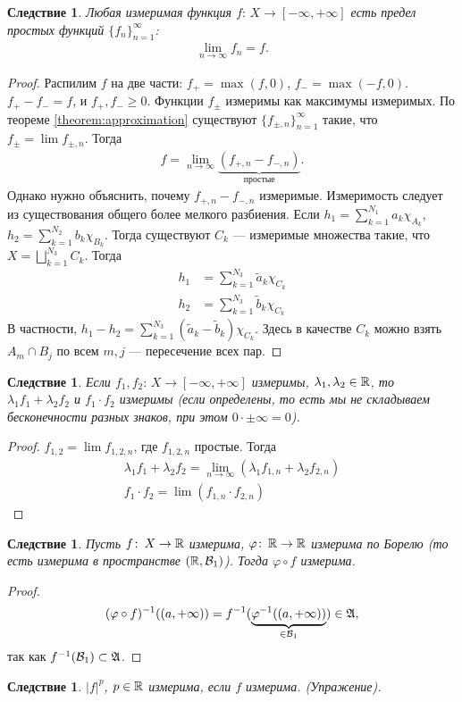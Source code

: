 \documentclass[a4paper,14pt]{extarticle}
\newcounter{theoremCnt}
\theoremstyle{definition}
\theoremstyle{plain}
\theoremstyle{plain}
\theoremstyle{plain}
\newtheorem{crly}[theoremCnt]{Следствие}
\theoremstyle{plain}
\theoremstyle{definition}
\theoremstyle{definition}
\theoremstyle{definition}
\theoremstyle{definition}
\theoremstyle{definition}
\theoremstyle{definition}
\theoremstyle{plain}
\theoremstyle{plain}
\theoremstyle{plain}
\theoremstyle{plain}
\theoremstyle{definition}
\theoremstyle{definition}
\theoremstyle{definition}
\theoremstyle{definition}
\theoremstyle{definition}
\newcommand{\R}{\ensuremath \mathbb{R}}
\newcommand{\A}{\ensuremath \mathfrak{A}}
\begin{document}
\begin{crly}
 Любая измеримая функция $f \colon\, X \to [-\infty, +\infty] $ есть предел простых функций $\{f_{n}\}_{n=1}^{\infty} $: \begin{align*}
  \lim_{n \to \infty} f_n = f
 .\end{align*} 
\end{crly}
\begin{proof}
Распилим $f$ на две части: $f_+ = \max(f, 0)$, $f_- = \max(-f, 0)$. $f_+ - f_- = f$, и  $f_+, f_- \geqslant 0$. Функции $f_{\pm}$ измеримы как максимумы измеримых. По теореме \ref{theorem:approximation} существуют $\{f_{\pm,n}\}_{n=1}^{\infty} $ такие, что $f_{\pm} = \lim f_{\pm,n}$. Тогда \begin{align*}
  f = \lim_{n \to \infty} \underbrace{(f_{+,n} - f_{-,n})}_{\text{ простые }}
 .\end{align*} Однако нужно объяснить, почему $f_{+,n} - f_{-,n}$ измеримые. Измеримость следует из существования общего более мелкого разбиения. Если  $h_1 = \sum_{k=1}^{N_1} a_k \chi_{A_k}$, $h_2 = \sum_{k=1}^{N_2} b_k \chi_{B_k}$. Тогда существуют $C_k$ --- измеримые множества такие, что  $X = \bigsqcup_{k=1}^{N_3} C_k $. Тогда \begin{align*}
 h_1 &= \sum_{k=1}^{N_3} \tilde a_{k} \chi_{C_k} \\
 h_2 &= \sum_{k=1}^{N_3} \tilde b_{k} \chi_{C_k}
\end{align*} В частности, $h_1 - h_2 = \sum_{k=1}^{N_3} (\tilde a_k - \tilde b_k) \chi_{C_k}$. Здесь в качестве $C_k$ можно взять $A_m \cap B_j$ по всем $m,j$ --- пересечение всех пар.
\end{proof}
\begin{crly}
 Если $f_1,f_2 \colon\, X \to [-\infty, +\infty] $ измеримы, $\lambda_1, \lambda_2 \in \R$, то $\lambda_1 f_1 + \lambda_2 f_2$ и $f_1 \cdot f_2$ измеримы (если определены, то есть мы не складываем бесконечности разных знаков, при этом $0 \cdot \pm \infty = 0$).
\end{crly}
\begin{proof}
 $ f_{1,2} = \lim f_{1,2,n} $, где $f_{1,2,n}$ простые. Тогда \begin{align*}
  \lambda_1 f_1 + \lambda_2 f_2 = \lim_{n \to \infty} \left( \lambda_1 f_{1,n} + \lambda_2 f_{2,n} \right) \\
  f_1 \cdot f_2 = \lim (f_{1,n} \cdot f_{2,n})
 \end{align*} 
\end{proof}
\begin{crly}
 Пусть $f \colon\, X \to \R  $ измерима, $\varphi \colon\, \R \to \R  $ измерима по Борелю (то есть измерима в пространстве $(\R, \B_1)$). Тогда $\varphi \circ f$ измерима.
\end{crly}
\begin{proof}
 \begin{align*}
  (\varphi \circ f)^{-1} ((a, +\infty)) = f^{-1} ( \underbrace{\varphi^{-1}((a, +\infty))}_{\in \B_1} ) \in \A
 ,\end{align*} так как $f^{-1}(\B_1) \subset \A$.
\end{proof}
\begin{crly}
 $\left| f \right|^{p}$, $p \in \R$ измерима, если $f$ измерима. (Упражение).
\end{crly}
\end{document}
